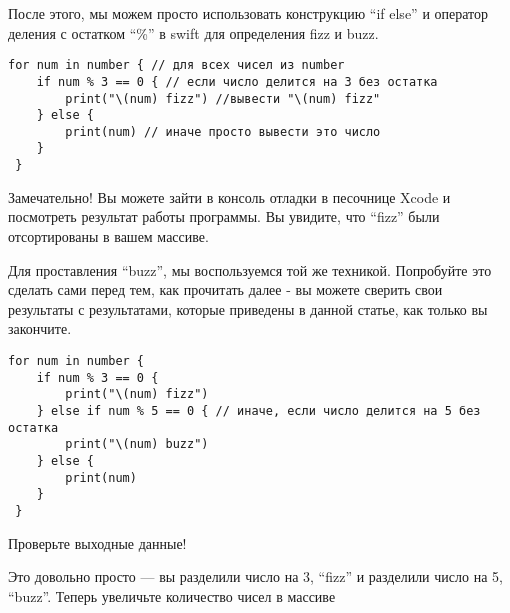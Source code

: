 \vspace{\baselineskip}

После этого, мы можем просто использовать конструкцию “if else” и оператор деления с остатком “\%” в swift для определения fizz и buzz.

\vspace{\baselineskip}

\begin{tcolorbox} 
\begin{verbatim}
for num in number { // для всех чисел из number
	if num % 3 == 0 { // если число делится на 3 без остатка
		print("\(num) fizz") //вывести "\(num) fizz"
	} else {
		print(num) // иначе просто вывести это число
	}
 }
\end{verbatim}
\end{tcolorbox}

\vspace{\baselineskip}

Замечательно! Вы можете зайти в консоль отладки в песочнице Xcode и посмотреть результат работы программы. Вы увидите, что “fizz” были отсортированы в вашем массиве.

\vspace{\baselineskip}

Для проставления “buzz”, мы воспользуемся той же техникой. Попробуйте это сделать сами перед тем, как прочитать далее - вы можете сверить свои результаты с результатами, которые приведены в данной статье, как только вы закончите.

\vspace{\baselineskip}

\begin{tcolorbox} 
\begin{verbatim}
for num in number {
	if num % 3 == 0 {
		print("\(num) fizz")
	} else if num % 5 == 0 { // иначе, если число делится на 5 без остатка
		print("\(num) buzz")
	} else {
		print(num)
	}
 }
\end{verbatim}
\end{tcolorbox}

\vspace{\baselineskip}

Проверьте выходные данные!

\vspace{\baselineskip}

Это довольно просто --- вы разделили число на 3, “fizz” и	разделили число на 5, “buzz”. Теперь увеличьте количество чисел в массиве

\vspace{\baselineskip}

